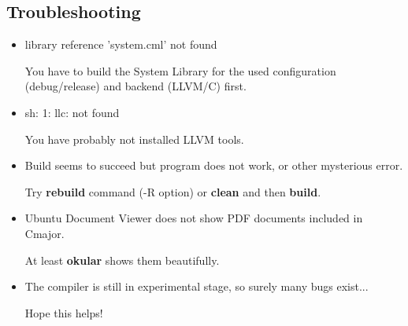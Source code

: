 \documentclass[oneside, a4paper, 11pt]{article}
\begin{document}
\subsection{Troubleshooting}

\begin{itemize}

\item
library reference 'system.cml' not found

You have to build the System Library for the used configuration (debug/release) and backend (LLVM/C) first.

\item
sh: 1: llc: not found

You have probably not installed LLVM tools.

\item
Build seems to succeed but program does not work, or other mysterious error.

Try \textbf{rebuild} command (-R option) or \textbf{clean} and then \textbf{build}.

\item
Ubuntu Document Viewer does not show PDF documents included in Cmajor.

At least \textbf{okular} shows them beautifully.

\item
The compiler is still in experimental stage, so surely many bugs exist...

Hope this helps!
\end{itemize}
\end{document}
